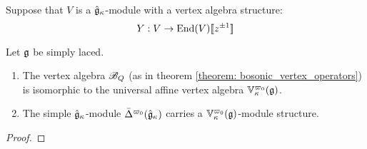         Suppose that $V$ is a $\hat{\mathfrak{g}}_{\kappa}$-module with a vertex algebra structure:
            $$Y: V \to \mathrm{End}(V)[\![z^{\pm 1}]\!]$$
        

        \begin{theorem} \label{theorem: level_1_FKS_realisation}
            Let $\mathfrak{g}$ be simply laced.
            \begin{enumerate}
                \item The vertex algebra $\mathscr{B}_Q$ (as in theorem \ref{theorem: bosonic_vertex_operators}) is isomorphic to the universal affine vertex algebra $\mathbb{V}_{\kappa}^{\varpi_0}(\mathfrak{g})$.
                \item The simple $\hat{\mathfrak{g}}_{\kappa}$-module $\bar{\Delta}^{\varpi_0}(\hat{\mathfrak{g}}_{\kappa})$ carries a $\mathbb{V}_{\kappa}^{\varpi_0}(\mathfrak{g})$-module structure.
            \end{enumerate}
        \end{theorem}
            \begin{proof}
                
            \end{proof}